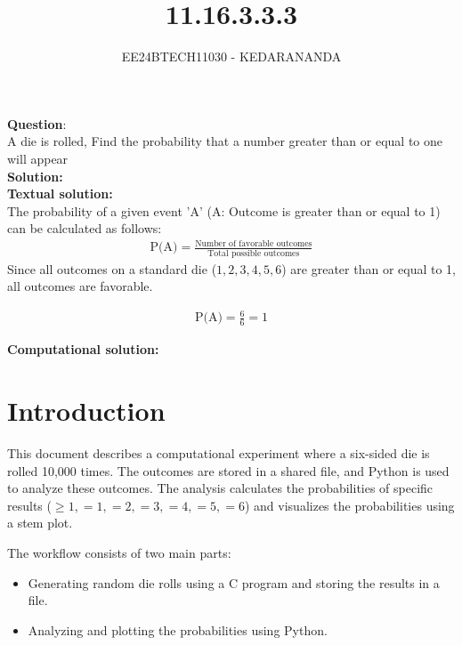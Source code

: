 \documentclass[journal]{IEEEtran}
\begin{document}
	
	
	\vspace{3cm}
	
	\title{11.16.3.3.3}
	\author{EE24BTECH11030 - KEDARANANDA}
	{\let\newpage\relax\maketitle}
	
	\renewcommand{\thefigure}{\theenumi}
	\renewcommand{\thetable}{\theenumi}
	\setlength{\intextsep}{10pt} %
	
	
	\renewcommand{\thetable}{\theenumi}
	
	
	\textbf{Question}:\\
	A die is rolled, Find the probability that a number greater than or equal to one  will appear \\
	\textbf{Solution: }\\
	\textbf{Textual solution: }\\
	The probability of a given event 'A' (A: Outcome is greater than or equal to 1) can be calculated as follows: 
	\begin{align}
		\text{P(A)} = \frac{\text{Number of favorable outcomes}}{\text{Total possible outcomes}}
	\end{align}
	Since all outcomes on a standard die (\(1, 2, 3, 4, 5, 6\)) are greater than or equal to 1, all outcomes are favorable.
	
	\begin{align}
		\text{P(A)} = \frac{6}{6} = 1
	\end{align}
	
	\textbf{Computational solution: }\\
	\section*{Introduction}
	This document describes a computational experiment where a six-sided die is rolled 10,000 times. The outcomes are stored in a shared file, and Python is used to analyze these outcomes. The analysis calculates the probabilities of specific results (\( \geq 1, =1, =2, =3, =4, =5, =6 \)) and visualizes the probabilities using a stem plot.
	
	The workflow consists of two main parts:
	\begin{itemize}
		\item Generating random die rolls using a C program and storing the results in a file.
		\item Analyzing and plotting the probabilities using Python.
	\end{itemize}
	
\end{document}
